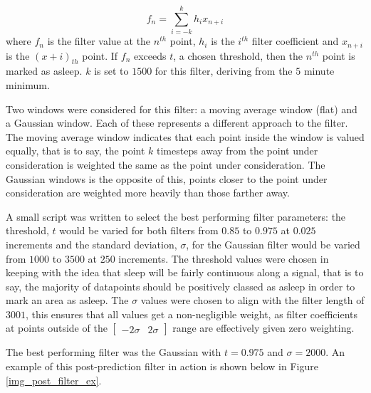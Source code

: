             \begin{equation}
                f_n = \sum_{i=-k}^k h_ix_{n+i}
            \end{equation}
            where $f_n$ is the filter value at the $n^{th}$ point, $h_i$ is the $i^{th}$ filter coefficient and $x_{n+i}$ is the $(x+i)_{th}$ point. If $f_n$ exceeds $t$, a chosen threshold, then the $n^{th}$ point is marked as asleep. $k$ is set to $1500$ for this filter, deriving from the $5$ minute minimum. 

            Two windows were considered for this filter: a moving average window (flat) and a Gaussian window. Each of these represents a different approach to the filter. The moving average window indicates that each point inside the window is valued equally, that is to say, the point $k$ timesteps away from the point under consideration is weighted the same as the point under consideration. The Gaussian windows is the opposite of this, points closer to the point under consideration are weighted more heavily than those farther away.

            A small script was written to select the best performing filter parameters: the threshold, $t$ would be varied for both filters from $0.85$ to $0.975$ at $0.025$ increments and the standard deviation, $\sigma$, for the Gaussian filter would be varied from $1000$ to $3500$ at $250$ increments. The threshold values were chosen in keeping with the idea that sleep will be fairly continuous along a signal, that is to say, the majority of datapoints should be positively classed as asleep in order to mark an area as asleep. The $\sigma$ values were chosen to align with the filter length of $3001$, this ensures that all values get a non-negligible weight, as filter coefficients at points outside of the $\begin{bmatrix}-2\sigma & 2\sigma \end{bmatrix}$ range are effectively given zero weighting.

            The best performing filter was the Gaussian with $t=0.975$ and $\sigma=2000$. An example of this post-prediction filter in action is shown below in Figure \ref{img_post_filter_ex}.

